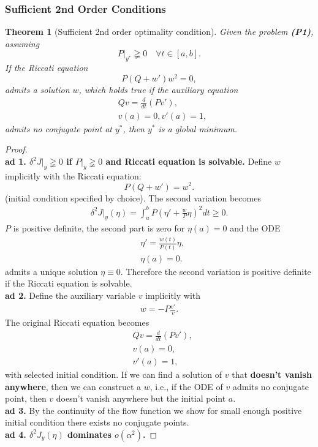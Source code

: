 \documentclass[a4paper,11pt,fleqn]{book}
\newtheorem{theorem}{Theorem}[section]
\theoremstyle{definition}
\theoremstyle{remark}
\begin{document}
\subsubsection{Sufficient 2nd Order Conditions}
\begin{theorem}[Sufficient 2nd order optimality condition]
Given the problem \textbf{(P1)}, assuming
\begin{equation*}
	P|_{y^*} \gneqq 0 \quad \forall t \in [a, b]. 
\end{equation*}
If the Riccati equation
\begin{equation}
	P(Q + w')w^2 = 0, 
\end{equation}
admits a solution $w$, which holds true if the auxiliary equation
\begin{equation}
\begin{aligned}
	& Qv =  \frac{d}{dt} (Pv'),\\
	& v(a) = 0, v'(a) = 1,
\end{aligned}
\end{equation}
admits no conjugate point at $y^*$, then $y^*$ is a global minimum.  
\end{theorem}
\begin{proof}
\quad\\
\textbf{ad 1. $\delta^2J|_y \gneqq 0$ if $P|_y \gneqq 0$ and Riccati equation is solvable. }
	Define $w$ implicitly with the Riccati equation:
	\begin{equation}
		P(Q + w') = w^2. 
	\end{equation}
	(initial condition specified by choice).
	The second variation becomes
	\begin{align*}
		\delta^2 J|_y(\eta) = \int_a^b P( \eta ' + \frac{w}{P}\eta)^2 dt \ge  0. 
	\end{align*} 
	$P$ is positive definite, the second part is zero for $\eta(a) = 0$ and 
	the ODE
	\begin{align*}
		&\eta' = \frac{w(t)}{P(t)} \eta, \\
		&\eta(a) = 0.
	\end{align*} 
	admits a unique solution $\eta \equiv 0$.  Therefore the second variation is positive definite if the Riccati equation is solvable. 
	\quad\\
	\textbf{ad 2.} Define the auxiliary variable $v$ implicitly with 
	\begin{align*}
		w = -P \frac{v'}{v}.
	\end{align*}
	The original Riccati equation becomes 
	\begin{align*}
		& Qv = \frac{d}{dt}(P v'), \\
		& v(a) = 0,\\
		& v'(a) = 1,
	\end{align*}
	with selected initial condition. If we can find a solution of $v$ that \textbf{doesn't vanish anywhere}, then we can construct a $w$, i.e., if the ODE of $v$ admits no conjugate point, then $v$ doesn't vanish anywhere but the initial point $a$. \\
	 \textbf{ad 3.} By the continuity of the flow function we show for small enough positive initial condition there exists no conjugate points.\\
	 \textbf{ad 4. $\delta^2 J_y(\eta)$ dominates $o(\alpha^2)$.} 
\end{proof}
\end{document}
